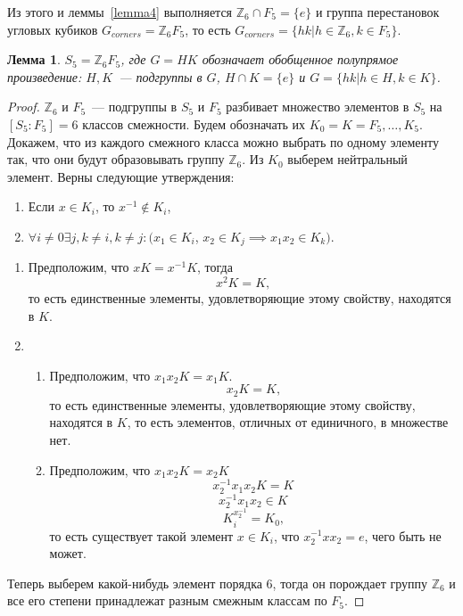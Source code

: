 \documentclass[utf8,a4paper,12pt]{article}
\newtheorem{lemma_cub}{Лемма}[section]
\begin{document}
Из этого и леммы~\ref{lemma4} выполняется $\mathbb{Z}_6\cap F_5=\{e\}$ и группа перестановок угловых кубиков $G_{corners}=\mathbb{Z}_6F_5$, то есть $G_{corners}=\{hk|h\in\mathbb{Z}_6,k\in F_5\}$.
\begin{lemma_cub}
$S_5=\mathbb{Z}_6F_5$, где $G=HK$ обозначает обобщенное полупрямое произведение: $H, K$~--- подгруппы в $G$, $H\cap K=\{e\}$ и $G=\{hk|h\in H, k\in K\}$.
\end{lemma_cub}
\begin{proof}
$\mathbb{Z}_6$ и $F_5$~--- подгруппы в $S_5$ и $F_5$ разбивает множество элементов в $S_5$ на $[S_5:F_5]=6$ классов смежности. Будем обозначать их $K_0=K=F_5,\ldots,K_5$. Докажем, что из каждого смежного класса можно выбрать по одному элементу так, что они будут образовывать группу $\mathbb{Z}_6$. Из $K_0$ выберем нейтральный элемент. Верны следующие утверждения:
\begin{enumerate}
\item Если $x\in K_i$, то $x^{-1}\not\in K_i$,
\item $\forall i\not=0\exists j, k\not=i,k\not=j: (x_1\in K_i$, $x_2\in K_j\implies x_1x_2\in K_k)$.
\hspace{0.5cm}\\
\end{enumerate}

\begin{enumerate}
\item Предположим, что $xK=x^{-1}K$, тогда $$x^2K=K\text{,}$$ то есть единственные элементы, удовлетворяющие этому свойству, находятся в $K$.
\item
\begin{enumerate}
\item Предположим, что $x_1x_2K=x_1K$.
$$x_2K=K\text{,}$$
то есть единственные элементы, удовлетворяющие этому свойству, находятся в $K$, то есть элементов, отличных от единичного, в множестве нет.
\item Предположим, что $x_1x_2K=x_2K$
$$x_2^{-1}x_1x_2K=K$$
$$x_2^{-1}x_1x_2\in K$$
$$K_i^{x_2^{-1}}=K_0\text{,}$$ то есть существует такой элемент $x\in K_i$, что $x_2^{-1}xx_2=e$, чего быть не может.
\end{enumerate}
\end{enumerate}
Теперь выберем какой-нибудь элемент порядка 6, тогда он порождает группу $\mathbb{Z}_6$ и все его степени принадлежат разным смежным классам по $F_5$.
\end{proof}
\end{document}
